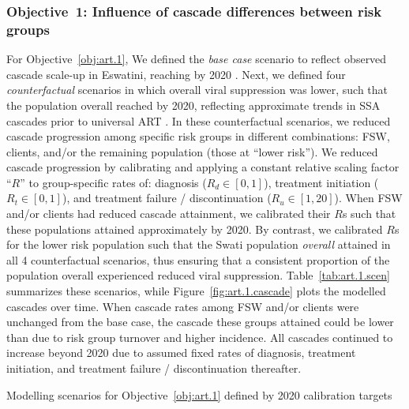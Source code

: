 \subsubsection{Objective~1: Influence of cascade differences between risk groups}\label{art.meth.obj.1}
For Objective~\ref{obj:art.1},
We defined the \emph{base case} scenario to reflect
observed cascade scale-up in Eswatini, reaching \cashi by 2020 \cite{SHIMS3,AIDSinfo}.
Next, we defined four \emph{counterfactual} scenarios in which overall viral suppression was lower,
such that the population overall reached \casmd by 2020,
reflecting approximate trends in SSA cascades prior to universal ART \cite{AIDSinfo}.
In these counterfactual scenarios, we reduced cascade progression
among specific risk groups in different combinations:
FSW, clients, and/or the remaining population (those at ``lower risk'').
We reduced cascade progression by calibrating and applying
a constant relative scaling factor ``$R$'' to group-specific rates of:
diagnosis ($R_d \in [0,1]$),
treatment initiation ($R_t \in [0,1]$), and
treatment failure / discontinuation ($R_u \in [1,20]$).
When FSW and/or clients had reduced cascade attainment, we calibrated their $R$s such that
these populations attained approximately \caslo by 2020.
By contrast, we calibrated $R$s for the lower risk population such that
the Swati population \emph{overall} attained \casmd in all 4 counterfactual scenarios,
thus ensuring that a consistent proportion of the population overall
experienced reduced viral suppression.
Table~\ref{tab:art.1.scen} summarizes these scenarios, while
Figure~\ref{fig:art.1.cascade} plots the modelled cascades over time.
When cascade rates among FSW and/or clients were unchanged from the base case,
the cascade these groups attained could be lower than \cashi
due to risk group turnover and higher incidence.
All cascades continued to increase beyond 2020 due to assumed fixed rates of
diagnosis, treatment initiation, and treatment failure / discontinuation thereafter.
\begin{table}
  \centering
  \caption{Modelling scenarios for Objective~\ref{obj:art.1} defined by 2020 calibration targets}
  \label{tab:art.1.scen}
  
\end{table}
